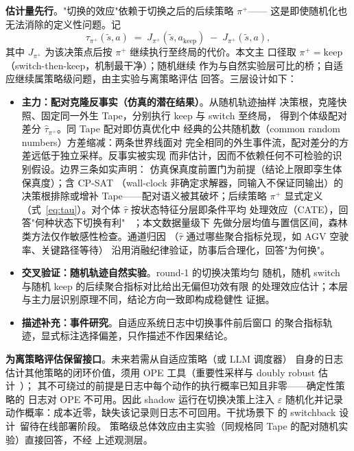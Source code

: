 \documentclass[11pt,a4paper]{article}
\begin{document}
\textbf{估计量先行}。"切换的效应"依赖于切换之后的后续策略 $\pi^+$——
这是即使随机化也无法消除的定义性问题。记
\begin{equation}
\tau_{\pi^+}(\tilde{s}, a) \;=\; J_{\pi^+}(\tilde{s}, a_\text{keep})
\;-\; J_{\pi^+}(\tilde{s}, a),
\label{eq:tau}
\end{equation}
其中 $J_{\pi^+}$ 为该决策点后按 $\pi^+$ 继续执行至终局的代价。本文主
口径取 $\pi^+ = \text{keep}$（switch-then-keep，机制最干净）；随机继续
作为与自然实验层可比的桥；自适应继续属策略级问题，由主实验与离策略评估
回答。三层设计如下：
\begin{itemize}
    \item \textbf{主力：配对克隆反事实（仿真的潜在结果）}。从随机轨迹抽样
    决策根，克隆快照、固定同一外生 Tape，分别执行 keep 与 switch 至终局，
    得到个体级配对差分 $\hat{\tau}_{\pi^+}$。同 Tape 配对即仿真优化中
    经典的公共随机数（common random numbers）方差缩减：两条世界线面对
    完全相同的外生事件流，配对差分的方差远低于独立采样。反事实被实现
    而非估计，因而不依赖任何不可检验的识别假设。边界三条如实声明：
    仿真保真度前置门为前提（结论上限即孪生体保真度）；含 CP-SAT
    （wall-clock 非确定求解器，同输入不保证同输出）的决策根排除或增补
    Tape——配对语义被其破坏；后续策略 $\pi^+$ 显式定义
    （式~\ref{eq:tau}）。对个体 $\hat{\tau}$ 按状态特征分层即条件平均
    处理效应（CATE），回答"何种状态下切换有利"
    ~\citep{kunzel2019metalearners,wager2018estimation}；本文数据量级下
    先做分层均值与置信区间，森林类方法仅作敏感性检查。通道归因
    （$\hat{\tau}$ 通过哪些聚合指标兑现，如 AGV 空驶率、关键路径等待）
    沿用消融纪律验证，防事后合理化，回答"为何换"。
    \item \textbf{交叉验证：随机轨迹自然实验}。round-1 的切换决策均匀
    随机，随机 switch 与随机 keep 的后续聚合指标对比给出无偏但功效有限
    的处理效应估计；本层与主力层识别原理不同，结论方向一致即构成稳健性
    证据。
    \item \textbf{描述补充：事件研究}。自适应系统日志中切换事件前后窗口
    的聚合指标轨迹，显式标注选择偏差，只作描述不作因果结论。
\end{itemize}

\textbf{为离策略评估保留接口}。未来若需从自适应策略（或 LLM 调度器）
自身的日志估计其他策略的闭环价值，须用 OPE 工具（重要性采样与 doubly
robust 估计~\citep{dudik2014doubly,uehara2022review,voloshin2021empirical}）；
其不可绕过的前提是日志中每个动作的执行概率已知且非零——确定性策略的
日志对 OPE 不可用。因此 shadow 运行在切换决策上注入 $\varepsilon$
随机化并记录动作概率：成本近零，缺失该记录则日志不可回用。干扰场景下
的 switchback 设计~\citep{bojinov2023switchback}留待在线部署阶段。
策略级总体效应由主实验（同规格同 Tape 的配对随机实验）直接回答，不经
上述观测层。
\end{document}
